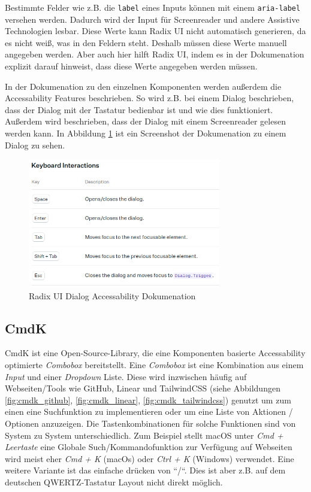 Bestimmte Felder wie z.B. die \texttt{label} eines Inputs können mit einem \texttt{aria-label} versehen werden. Dadurch wird der Input für Screenreader und andere Assistive Technologien lesbar. Diese Werte kann Radix UI nicht automatisch generieren, da es nicht weiß, was in den Feldern steht. Deshalb müssen diese Werte manuell angegeben werden. Aber auch hier hilft Radix UI, indem es in der Dokumenation explizit darauf hinweist, dass diese Werte angegeben werden müssen.

In der Dokumenation zu den einzelnen Komponenten werden außerdem die Accessability Features beschrieben. So wird z.B. bei einem Dialog beschrieben, dass der Dialog mit der Tastatur bedienbar ist und wie dies funktioniert. Außerdem wird beschrieben, dass der Dialog mit einem Screenreader gelesen werden kann. In Abbildung \ref{fig:radix_dialog_keyboard} ist ein Screenshot der Dokumenation zu einem Dialog zu sehen.

\begin{figure}[th]
\centering
\includegraphics[width=0.75\textwidth]{Figures/radix_dialog_keyboard.png}
\decoRule
\caption[Dialog Accessability Dokumenation]{Radix UI Dialog Accessability Dokumenation}
\label{fig:radix_dialog_keyboard}
\end{figure}

\subsection{CmdK}

CmdK ist eine Open-Source-Library, die eine Komponenten basierte Accessability optimierte \textit{Combobox} bereitstellt. Eine \textit{Combobox} ist eine Kombination aus einem \textit{Input} und einer \textit{Dropdown} Liste. Diese wird inzwischen häufig auf Webseiten/Tools wie GitHub, Linear und TailwindCSS (siehe Abbildungen \ref{fig:cmdk_github}, \ref{fig:cmdk_linear}, \ref{fig:cmdk_tailwindcss}) genutzt um zum einen eine Suchfunktion zu implementieren oder um eine Liste von Aktionen / Optionen anzuzeigen. Die Tastenkombinationen für solche Funktionen sind von System zu System unterschiedlich. Zum Beispiel stellt macOS unter \emph{Cmd + Leertaste} eine Globale Such/Kommandofunktion zur Verfügung auf Webseiten wird meist eher \emph{Cmd + K} (macOs) oder \emph{Ctrl + K} (Windows) verwendet. Eine weitere Variante ist das einfache drücken von ``/``. Dies ist aber z.B. auf dem deutschen QWERTZ-Tastatur Layout nicht direkt möglich.

